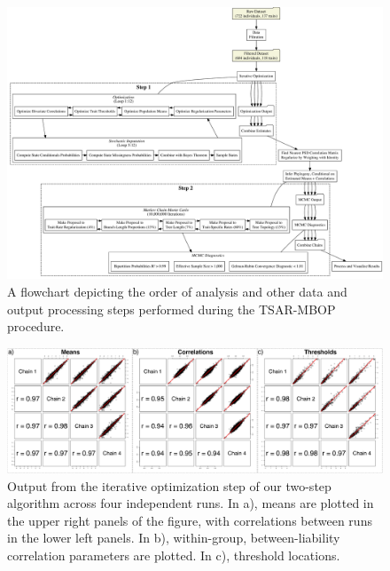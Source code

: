 \documentclass[10pt, twocolumn, twoside]{article}
\begin{document}
\begin{figure}[h]
\centering
\includegraphics[width=160mm]{figures/tsarmbop.pdf}
\caption[TSAR-MBOP Flowchart]{A flowchart depicting the order of analysis and other data and output processing steps performed during the TSAR-MBOP procedure. \label{overflow}
\label{fig:tsarMBOP}
}
\end{figure}

\begin{figure}[h]
\centering
\includegraphics[width=160mm]{figures/chpt4_figure3.pdf}
\caption[Optimization Output from Four Runs of Discrete Dental Analysis]{Output from the iterative optimization step of our two-step algorithm across four independent runs. In a), means are plotted in the upper right panels of the figure, with correlations between runs in the lower left panels. In b), within-group, between-liability correlation parameters are plotted. In c), threshold locations.  
\label{fig:empiricalOptimOutput}
\label{overflow}}
\end{figure}
\end{document}
